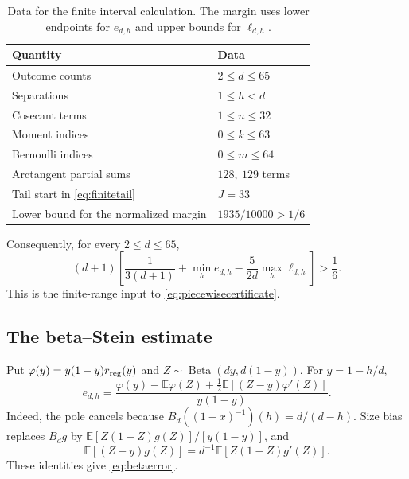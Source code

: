\documentclass[11pt]{amsart}
\theoremstyle{remark}
\theoremstyle{plain}
\numberwithin{equation}{section}
\DeclareMathOperator{\Beta}{Beta}
\begin{document}
\begin{table}[ht]
\centering
\small
\caption{Data for the finite interval calculation. The margin uses
lower endpoints for \(e_{d,h}\) and upper bounds for
\(\ell_{d,h}\).}
\label{tab:intervals}
\begin{tabular}{@{}ll@{}}
\toprule
Quantity & Data\\
\midrule
Outcome counts & \(2\le d\le65\)\\
Separations & \(1\le h<d\)\\
Cosecant terms & \(1\le n\le32\)\\
Moment indices & \(0\le k\le63\)\\
Bernoulli indices & \(0\le m\le64\)\\
Arctangent partial sums & \(128,\ 129\) terms\\
Tail start in \eqref{eq:finitetail} & \(J=33\)\\
Lower bound for the normalized margin & \(1935/10000>1/6\)\\
\bottomrule
\end{tabular}
\end{table}

Consequently, for every \(2\le d\le65\),
\begin{equation}\label{eq:finitecondition}
 (d+1)\left[
 \frac1{3(d+1)}+\min_he_{d,h}
 -\frac5{2d}\max_h\ell_{d,h}
 \right]>\frac16.
\end{equation}
This is the finite-range input to \eqref{eq:piecewisecertificate}.

\subsection{The beta--Stein estimate}

Put \(\varphi(y)=y(1-y)r_{\rm reg}(y)\) and
\(Z\sim\Beta(dy,d(1-y))\). For \(y=1-h/d\),
\begin{equation}\label{eq:betaerror}
 e_{d,h}=
 \frac{\varphi(y)-\mathbb E\varphi(Z)
       +\tfrac12\mathbb E[(Z-y)\varphi'(Z)]}{y(1-y)}.
\end{equation}
Indeed, the pole cancels because
\(B_d((1-x)^{-1})(h)=d/(d-h)\).
Size bias replaces \(B_dg\) by
\(\mathbb E[Z(1-Z)g(Z)]/[y(1-y)]\), and
\[
 \mathbb E[(Z-y)g(Z)]
 =d^{-1}\mathbb E[Z(1-Z)g'(Z)].
\]
These identities give \eqref{eq:betaerror}.
\end{document}
